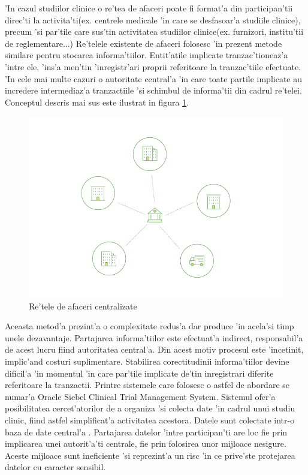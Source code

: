 \documentclass[12pt,a4paper,twoside]{report}
\begin{document}
	'In cazul studiilor clinice o re'tea de afaceri poate fi format'a din participan'tii direc'ti la activita'ti(ex. centrele medicale 'in care se desfasoar'a studiile clinice), precum 'si par'tile care sus'tin activitatea studiilor clinice(ex. furnizori, institu'tii de reglementare...)
	Re'telele existente de afaceri folosesc 'in prezent metode similare pentru stocarea informa'tiilor. Entit'atile implicate tranzac'tioneaz'a 'intre ele, 'ins'a men'tin 'inregistr'ari proprii referitoare la tranzac'tiile efectuate. 'In cele mai multe cazuri o autoritate central'a 'in care toate partile implicate au incredere intermediaz'a tranzactiile 'si schimbul de informa'tii din cadrul re'telei. Conceptul descris mai sus este ilustrat in figura \ref{fig:centralised}.\\	
		\begin{figure}[H]
		\begin{center}
			\includegraphics[scale=1.60]{img/current_network.png}
			\caption{Re'tele de afaceri centralizate\cite{fabricdoc}}
  			\label{fig:centralised}
  		\end{center}
  		\end{figure}
  		
	Aceasta metod'a prezint'a o complexitate redus'a dar produce 'in acela'si timp unele dezavantaje. Partajarea informa'tiilor este efectuat'a indirect, responsabil'a de acest lucru fiind autoritatea central'a. Din acest motiv procesul este 'incetinit, implic'and costuri suplimentare. Stabilirea corectitudinii informa'tiilor devine dificil'a 'in momentul 'in care par'tile implicate de'tin inregistrari diferite referitoare la tranzactii.
		Printre sistemele care folosesc o astfel de abordare se numar'a Oracle Siebel Clinical Trial Management System\cite{ctms}. Sistemul ofer'a posibilitatea cercet'atorilor de a organiza 'si colecta date 'in cadrul unui studiu clinic, fiind astfel simplificat'a activitatea acestora. Datele sunt colectate intr-o baza de date central'a . Partajarea datelor 'intre participan'ti are loc fie prin implicarea unei autorit'a'ti centrale, fie prin folosirea unor mijloace nesigure. Aceste mijloace sunt ineficiente 'si reprezint'a un risc 'in ce prive'ste protejarea datelor cu caracter sensibil.\\	
\end{document}
